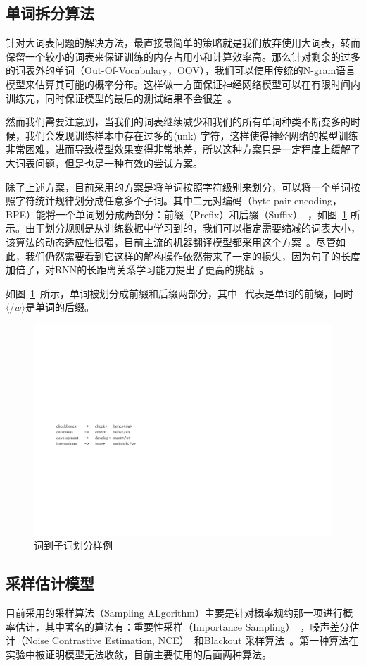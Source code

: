 \subsection{单词拆分算法}
针对大词表问题的解决方法，最直接最简单的策略就是我们放弃使用大词表，转而保留一个较小的词表来保证训练的内存占用小和计算效率高。那么针对剩余的过多的词表外的单词（Out-Of-Vocabulary，OOV），我们可以使用传统的N-gram语言模型来估算其可能的概率分布。这样做一方面保证神经网络模型可以在有限时间内训练完，同时保证模型的最后的测试结果不会很差~。

然而我们需要注意到，当我们的词表继续减少和我们的所有单词种类不断变多的时候，我们会发现训练样本中存在过多的$\langle$unk$\rangle$ 字符，这样使得神经网络的模型训练非常困难，进而导致模型效果变得非常地差，所以这种方案只是一定程度上缓解了大词表问题，但是也是一种有效的尝试方案。

除了上述方案，目前采用的方案是将单词按照字符级别来划分，可以将一个单词按照字符统计规律划分成任意多个子词。其中二元对编码（byte-pair-encoding，BPE）能将一个单词划分成两部分：前缀（Prefix）和后缀（Suffix）~，如图~\ref{fig:subword} 所示。由于划分规则是从训练数据中学习到的，我们可以指定需要缩减的词表大小，该算法的动态适应性很强，目前主流的机器翻译模型都采用这个方案~。尽管如此，我们仍然需要看到它这样的解构操作依然带来了一定的损失，因为句子的长度加倍了，对RNN的长距离关系学习能力提出了更高的挑战~。


如图~\ref{fig:subword}~所示，单词被划分成前缀和后缀两部分，其中$+$代表是单词的前缀，同时$\langle /w \rangle$是单词的后缀。
\begin{figure}[!h]
  \centering
\includegraphics[width=0.6\linewidth]{./figures/subword.pdf}
\caption{词到子词划分样例}\label{fig:subword}
\end{figure}

\subsection{采样估计模型}
目前采用的采样算法（Sampling ALgorithm）主要是针对概率规约那一项进行概率估计，其中著名的算法有：重要性采样（Importance Sampling）~，噪声差分估计（Noise Contrastive Estimation, NCE）~和Blackout 采样算法~。第一种算法在实验中被证明模型无法收敛，目前主要使用的后面两种算法。

